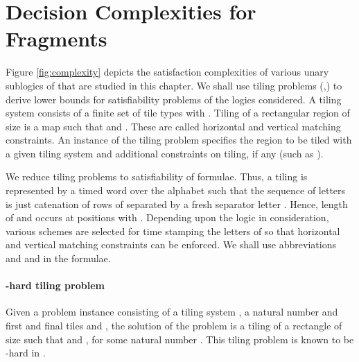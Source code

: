 \documentclass{llncs}
\newcommand{\mitlfp}{\mbox{}}
\newcommand{\mitl}{\mbox{}}
\newcommand{\expspace}{\mbox{}}
\begin{document}
\section{Decision Complexities for \mitlfp\/ Fragments}
Figure \ref{fig:complexity} depicts the satisfaction complexities of various unary sublogics of \mitl\/ that are studied in this chapter.
We shall use tiling problems (\cite{vEB97},\cite{Fur83}) to derive lower bounds for satisfiability problems of the logics considered.
A tiling system   consists of a finite set of tile types  
with .  Tiling of a rectangular region of size 
 is a map  
such that  and . These are called 
horizontal and vertical matching constraints. An instance of the tiling problem 
specifies the region to be tiled  with a given tiling system and additional 
constraints on tiling, if any (such as ).

We reduce tiling problems to satisfiability of  formulae. Thus, a tiling 
is represented by a timed word  over the alphabet  such that the sequence of letters is just catenation of rows of  separated by a fresh separator letter . Hence, length of  and  occurs at positions  with . Depending upon the logic in consideration, various schemes are selected for time stamping the 
letters of   so that horizontal and vertical matching constraints can be enforced. We shall use abbreviations  and  and  in the formulae.



\paragraph{\expspace-hard tiling problem} Given a problem instance consisting of a tiling system
, a natural number  and first and final tiles  and , the solution of the problem is a tiling  of a rectangle of size  such that  and , for some natural number . This tiling problem is known to be \expspace-hard in .\\
\end{document}
